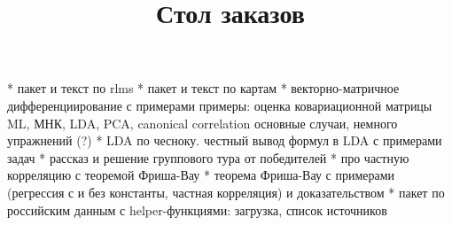 \documentclass[final,pdftex]{../../template/epsilonj}
\begin{document}
\setcounter{page}{2}

\begin{frontmatter}
\title{Стол заказов}

\begin{aug}
\author{ }%



\end{aug}



\end{frontmatter}




* пакет и текст по rlms
* пакет и текст по картам
* векторно-матричное дифференциирование с примерами 
примеры: оценка ковариационной матрицы ML, МНК, LDA, PCA, canonical correlation
основные случаи, немного упражнений (?)
* LDA по чесноку. честный вывод формул в LDA с примерами задач
* рассказ и решение группового тура от победителей
* про частную корреляцию с теоремой Фриша-Вау
* теорема Фриша-Вау с примерами (регрессия с и без константы, частная корреляция) и доказательством
* пакет по российским данным с helper-функциями: загрузка, список источников
\end{document}

